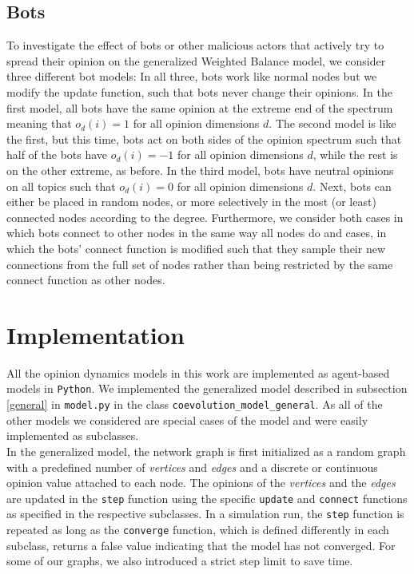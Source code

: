 \documentclass[11pt]{article}
\begin{document}
\subsection{Bots}
To investigate the effect of bots or other malicious actors that actively try to spread their opinion on the generalized Weighted Balance model, we consider three different bot models: In all three, bots work like normal nodes but we modify the update function, such that bots never change their opinions. In the first model, all bots have the same opinion at the extreme end of the spectrum meaning that $o_{d}(i)=1$ for all opinion dimensions $d$. The second model is like the first, but this time, bots act on both sides of the opinion spectrum such that half of the bots have $o_{d}(i)=-1$ for all opinion dimensions $d$, while the rest is on the other extreme, as before. In the third model, bots have neutral opinions on all topics such that $o_{d}(i)=0$ for all opinion dimensions $d$. Next, bots can either be placed in random nodes, or more selectively in the most (or least) connected nodes according to the degree. Furthermore, we consider both cases in which bots connect to other nodes in the same way all nodes do and cases, in which the bots' connect function is modified such that they sample their new connections from the full set of nodes rather than being restricted by the same connect function as other nodes. 

\section{Implementation} \label{impl}


All the opinion dynamics models in this work are implemented as agent-based models in \texttt{Python}. 
We implemented the generalized model described in subsection \ref{general} in \texttt{model.py} in the class \texttt{coevolution\_model\_general}. As all of the other models we considered are special cases of the model and were easily implemented as subclasses. \\
In the generalized model, the network graph is first initialized as a random graph with a predefined number of \textit{vertices} and \textit{edges} and a discrete or continuous opinion value attached to each node. The opinions of the \textit{vertices} and the \textit{edges} are updated in the  \texttt{step} function using the specific \texttt{update} and \texttt{connect} functions as specified in the respective subclasses. In a simulation run, the \texttt{step} function is repeated as long as the \texttt{converge} function, which is defined differently in each subclass, returns a false value indicating that the model has not converged. For some of our graphs, we also introduced a strict step limit to save time. 
\end{document}
